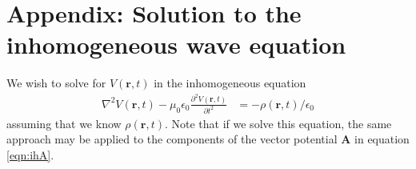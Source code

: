 \documentclass[12pt]{article}
\renewcommand{\vec}[1]{\boldsymbol{#1}}
\newcommand{\hvec}[1]{\hat{\vec{#1}}}
\begin{document}

\newpage

\appendix

\section{Appendix: Solution to the inhomogeneous wave equation}
\label{appendix:inhomogeneous}

We wish to solve for $V(\vec{r}, t)$ in the inhomogeneous equation
\begin{align}\label{eqn:ihV2}
\nabla^2 V(\vec{r}, t) - \mu_0\epsilon_0 \frac{\partial^2 V(\vec{r}, t)}{\partial t^2} &= -\rho(\vec{r}, t) / \epsilon_0
\end{align}
assuming that we know $\rho(\vec{r}, t)$.  Note that if we solve this 
equation, the same approach may be applied to the components
of the vector potential $\vec{A}$ in equation \ref{eqn:ihA}.
\end{document}
